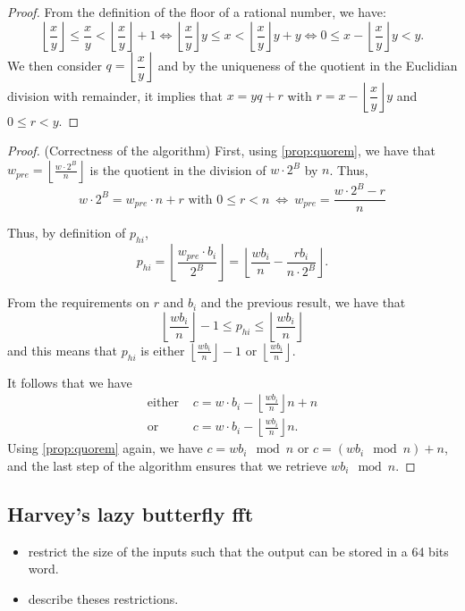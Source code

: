 \documentclass[a4paper]{article}
\begin{document}
\begin{proof}
From the definition of the floor of a rational number, we have:
\[
    \left\lfloor\dfrac{x}{y}\right\rfloor \leq \dfrac{x}{y} < \left\lfloor\dfrac{x}{y}\right\rfloor + 1 \Longleftrightarrow
    \left\lfloor\dfrac{x}{y}\right\rfloor y \leq x < \left\lfloor\dfrac{x}{y}\right\rfloor y + y \Longleftrightarrow
    0 \leq x - \left\lfloor\dfrac{x}{y}\right\rfloor y < y.
\]
We then consider $q=\left\lfloor\dfrac{x}{y}\right\rfloor$ and by the uniqueness of the quotient in the Euclidian division with remainder, 
it implies that $x = yq + r$ with $r=x - \left\lfloor\dfrac{x}{y}\right\rfloor y$ and $0 \leq r < y$.
\end{proof}

\begin{proof} (Correctness of the algorithm)
First, using \autoref{prop:quorem}, we have that $w_{pre}= \left\lfloor\frac{w\cdot 2^B}{n}\right\rfloor $ is the quotient in the division 
of $w\cdot 2^B$ by $n$. Thus,
\[
    w\cdot 2^B = w_{pre}\cdot n + r \text{ with } 0 \leq r < n\ \Longleftrightarrow\ w_{pre} = \dfrac{w\cdot 2^B - r}{n}
\]

Thus, by definition of $p_{hi}$,
\[
p_{hi} = \left\lfloor\frac{w_{pre}\cdot b_i}{2^B}\right\rfloor
= \left\lfloor\dfrac{wb_i}{n} - \dfrac{rb_i}{n\cdot 2^B} \right\rfloor.
\]

From the requirements on $r$ and $b_i$ and the previous result, we have that
\[
\left\lfloor\dfrac{wb_i}{n}\right\rfloor - 1 \leq p_{hi} \leq \left\lfloor\dfrac{wb_i}{n}\right\rfloor
\]
and this means that $p_{hi}$ is either $\left\lfloor\frac{wb_i}{n}\right\rfloor - 1$ or $\left\lfloor\frac{wb_i}{n}\right\rfloor$.


It follows that we have
\begin{align*}
\text{either } &c=w\cdot b_i - \left\lfloor\frac{wb_i}{n}\right\rfloor n + n \\
\text{or } &c=w\cdot b_i - \left\lfloor\frac{wb_i}{n}\right\rfloor n.
\end{align*}
Using \autoref{prop:quorem} again, we have $c=wb_i \mod n$ or $c=(wb_i \mod n)+n$, and the last step of the algorithm ensures 
that we retrieve $wb_i \mod n$.
\end{proof}

\subsection{Harvey's lazy butterfly fft}

\begin{itemize}
    \item restrict the size of the inputs such that the output can be stored in a 64 bits word.
    \item describe theses restrictions.
\end{itemize}
\end{document}
